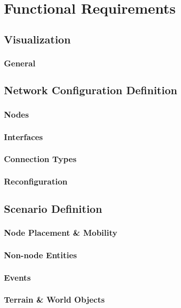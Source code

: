 \section{Functional Requirements}

\subsection{Visualization}
\subsubsection{General}

\subsection{Network Configuration Definition}
\subsubsection{Nodes}
\subsubsection{Interfaces}
\subsubsection{Connection Types}
\subsubsection{Reconfiguration}

\subsection{Scenario Definition}
\subsubsection{Node Placement \& Mobility}
\subsubsection{Non-node Entities}
\subsubsection{Events}
\subsubsection{Terrain \& World Objects}

